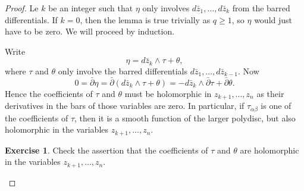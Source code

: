 \documentclass[12pt,openany]{book}
\theoremstyle{plain}
\theoremstyle{remark}
\theoremstyle{definition}
\newenvironment{exbox}{%
    \def\FrameCommand{\vrule width 1pt \relax\hspace{10pt}}%
    \MakeFramed{\advance\hsize-\width\FrameRestore}%
}{%
    \endMakeFramed
}
\theoremstyle{exercise}
\newtheorem{exercise}{Exercise}[section]
\theoremstyle{example}
\begin{document}
\begin{proof}
Le $k$ be an integer such that $\eta$ only involves
$d\bar{z}_1,\ldots,d\bar{z}_k$ from the barred differentials.
If $k=0$, then the lemma is true trivially as $q \geq 1$, so $\eta$ would
just have to be zero.
We will proceed by induction.

Write
\begin{equation*}
\eta = d\bar{z}_k \wedge \tau + \theta,
\end{equation*}
where $\tau$ and $\theta$ only involve the barred differentials
$d\bar{z}_1,\ldots,d\bar{z}_{k-1}$.
Now
\begin{equation*}
0 = \bar{\partial} \eta
= \bar{\partial} (d\bar{z}_k \wedge \tau + \theta)
= -d\bar{z}_k \wedge \bar{\partial} \tau + \bar{\partial} \theta .
\end{equation*}
Hence the coefficients of $\tau$ and $\theta$ must be holomorphic in
$z_{k+1},\ldots,z_n$ as their derivatives in the bars of those variables
are zero.
In particular, if $\tau_{\alpha \beta}$ is one of the coefficients
of $\tau$, then it is a smooth function of the larger polydisc, but also
holomorphic in the variables $z_{k+1},\ldots,z_{n}$.

\begin{exbox}
\begin{exercise}
Check the assertion that the coefficients of
$\tau$ and $\theta$ are holomorphic in the variables $z_{k+1},\ldots,z_n$.
\end{exercise}
\end{exbox}



\end{proof}
\end{document}
